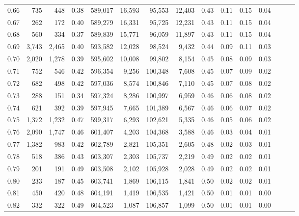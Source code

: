 \begin{tabular}{rrrrrrrrrrrrrrr}
0.66 &     735 &    448 &  0.38 &  589,017 &   16,593 &   95,553 &   12,403 &  0.43 &  0.11 &  0.15 &      0.04 \\
0.67 &     262 &    172 &  0.40 &  589,279 &   16,331 &   95,725 &   12,231 &  0.43 &  0.11 &  0.15 &      0.04 \\
0.68 &     560 &    334 &  0.37 &  589,839 &   15,771 &   96,059 &   11,897 &  0.43 &  0.11 &  0.15 &      0.04 \\
0.69 &   3,743 &  2,465 &  0.40 &  593,582 &   12,028 &   98,524 &    9,432 &  0.44 &  0.09 &  0.11 &      0.03 \\
0.70 &   2,020 &  1,278 &  0.39 &  595,602 &   10,008 &   99,802 &    8,154 &  0.45 &  0.08 &  0.09 &      0.03 \\
0.71 &     752 &    546 &  0.42 &  596,354 &    9,256 &  100,348 &    7,608 &  0.45 &  0.07 &  0.09 &      0.02 \\
0.72 &     682 &    498 &  0.42 &  597,036 &    8,574 &  100,846 &    7,110 &  0.45 &  0.07 &  0.08 &      0.02 \\
0.73 &     288 &    151 &  0.34 &  597,324 &    8,286 &  100,997 &    6,959 &  0.46 &  0.06 &  0.08 &      0.02 \\
0.74 &     621 &    392 &  0.39 &  597,945 &    7,665 &  101,389 &    6,567 &  0.46 &  0.06 &  0.07 &      0.02 \\
0.75 &   1,372 &  1,232 &  0.47 &  599,317 &    6,293 &  102,621 &    5,335 &  0.46 &  0.05 &  0.06 &      0.02 \\
0.76 &   2,090 &  1,747 &  0.46 &  601,407 &    4,203 &  104,368 &    3,588 &  0.46 &  0.03 &  0.04 &      0.01 \\
0.77 &   1,382 &    983 &  0.42 &  602,789 &    2,821 &  105,351 &    2,605 &  0.48 &  0.02 &  0.03 &      0.01 \\
0.78 &     518 &    386 &  0.43 &  603,307 &    2,303 &  105,737 &    2,219 &  0.49 &  0.02 &  0.02 &      0.01 \\
0.79 &     201 &    191 &  0.49 &  603,508 &    2,102 &  105,928 &    2,028 &  0.49 &  0.02 &  0.02 &      0.01 \\
0.80 &     233 &    187 &  0.45 &  603,741 &    1,869 &  106,115 &    1,841 &  0.50 &  0.02 &  0.02 &      0.01 \\
0.81 &     450 &    420 &  0.48 &  604,191 &    1,419 &  106,535 &    1,421 &  0.50 &  0.01 &  0.01 &      0.00 \\
0.82 &     332 &    322 &  0.49 &  604,523 &    1,087 &  106,857 &    1,099 &  0.50 &  0.01 &  0.01 &      0.00 \\

\end{tabular}
